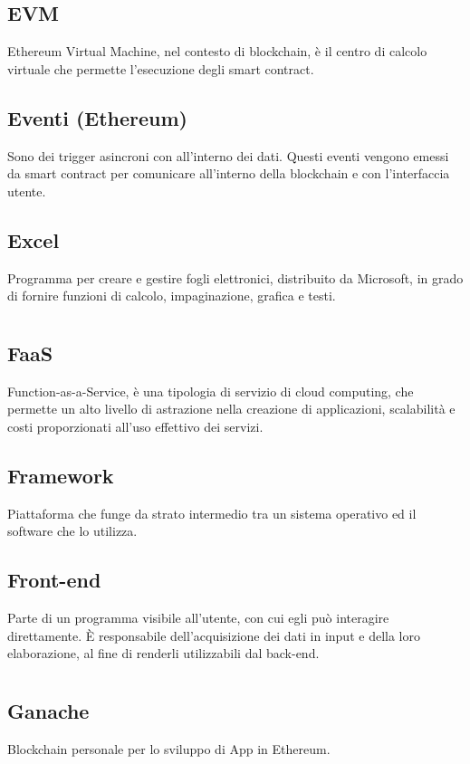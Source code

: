 	\subsection*{EVM}
	Ethereum Virtual Machine, nel contesto di blockchain, è il centro di calcolo virtuale che permette l’esecuzione degli smart contract.
	\subsection*{Eventi (Ethereum)}
	Sono dei trigger asincroni con all’interno dei dati. Questi eventi vengono emessi da smart contract per comunicare all’interno della blockchain e con l’interfaccia utente.
	\subsection*{Excel}
	Programma per creare e gestire fogli elettronici, distribuito da Microsoft, in grado di fornire funzioni di calcolo, impaginazione, grafica e testi.
\pagebreak
\section[F]{}
	\subsection*{FaaS}
	Function-as-a-Service, è una tipologia di servizio di cloud computing, che permette un alto livello di astrazione nella creazione di applicazioni, scalabilità e costi proporzionati all’uso effettivo dei servizi.
	\subsection*{Framework}
	Piattaforma che funge da strato intermedio tra un sistema operativo ed il software che lo utilizza.
	\subsection*{Front-end}
	Parte di un programma visibile all’utente, con cui egli può interagire direttamente. È responsabile dell’acquisizione dei dati in input e della loro elaborazione, al fine di renderli utilizzabili dal back-end.
\pagebreak
\section[G]{}
	\subsection*{Ganache}
	Blockchain personale per lo sviluppo di \DJ{}App in Ethereum.  
